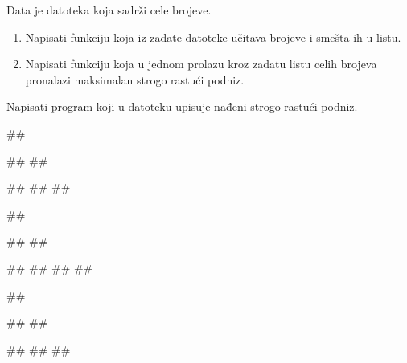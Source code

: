 \begin{Exercise}[label=611]
Data je datoteka  koja sadrži cele brojeve.
\begin{enumerate}
 \item Napisati funkciju koja iz zadate datoteke učitava brojeve i smešta ih u listu.
 \item Napisati funkciju koja u jednom prolazu kroz zadatu listu celih brojeva 
pronalazi maksimalan strogo rastući podniz.
\end{enumerate}
Napisati program koji u datoteku  upisuje nađeni strogo rastući podniz.

\noindent
\begin{minitest}
\begin{test}{1}
##

##
##

#\naslovIzlaz#
##
##
\end{test}
\end{minitest}
\begin{minitest}
\begin{test}{2}
##

##
##

#\naslovIzlaz#
##
##
##
\end{test}
\end{minitest}
\begin{minitest}
\begin{test}{3}
##

##
##

#\naslovIzlaz#
##
##
\end{test}
\end{minitest}
\end{Exercise}

\begin{Answer}[ref=611]
\end{Answer}

